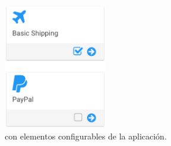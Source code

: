 	\begin{figure}[!h]
		\centering
		\includegraphics[width=0.4\textwidth]{figuras/dashboard/paypal_disabled.png}
		\caption{\dashboardEF con elementos configurables de la aplicación.}
		\label{figure:dashboard:paypal_disabled}
	\end{figure}

	

	

	

	

	